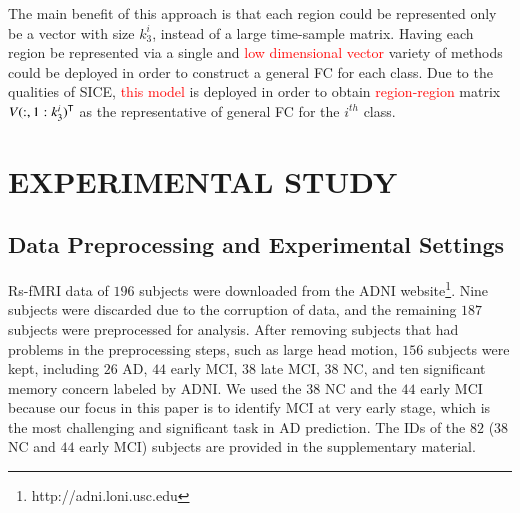 \documentclass[preprint,12pt]{elsarticle}
\begin{document}
The main benefit of this approach is that each
	region could be represented only be a vector with size $k_3^i$, instead of a large time-sample matrix. Having each region be represented via a single and \textcolor{red}{low dimensional vector} variety of methods could be deployed in order to construct a general FC for each class. 
Due to the qualities of SICE, \textcolor{red}{this model} is deployed in order to obtain \textcolor{red}{region-region} matrix  $V(:,1:k_3^i)^{\sf T}$ as the representative of general FC for the $i^{th}$ class.



\section{EXPERIMENTAL STUDY}
\subsection{Data Preprocessing and Experimental Settings}

Rs-fMRI data of $196$ subjects were downloaded from the ADNI website\footnote{http://adni.loni.usc.edu}. Nine subjects were discarded
due to the corruption of data, and the remaining $187$ subjects were preprocessed for analysis. After removing subjects that had problems in the preprocessing steps, such as large head motion,
$156$ subjects were kept, including $26$ AD, $44$ early MCI, $38$ late MCI, $38$ NC, and ten significant memory concern labeled by ADNI. We used the $38$ NC and the $44$ early MCI because our focus in this paper is to identify MCI at very early stage, which is the most challenging and significant task in AD
prediction. The IDs of the $82$ ($38$ NC and $44$ early MCI) subjects are provided in the supplementary material. 
\end{document}
